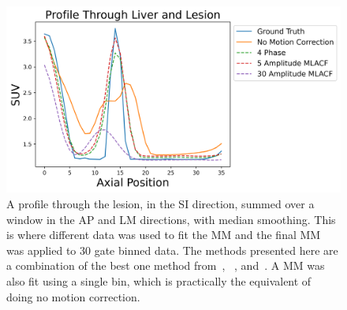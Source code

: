             \begin{figure}
                \centering
                
                \includegraphics[width=1.0\linewidth]{figures/motion_correction_2_results_2_best_profile.png}
                
                \captionsetup{singlelinecheck=false}
                \caption{
                    A profile through the lesion, in the \gls{SI} direction, summed over a window in the \gls{AP} and \gls{LM} directions, with median smoothing. This is where different data was used to fit the \gls{MM} and the final \gls{MM} was applied to $30$ gate binned data. The methods presented here are a combination of the best one method from~, ~, and~. A \gls{MM} was also fit using a single bin, which is practically the equivalent of doing no motion correction.
                }
                
                \label{fig:evaluation_of_pet_ct_motion_correction_incorporating_motion_models_using_mlacf_and_complex_gating_schemes_results_best_profile}
            \end{figure}
            
